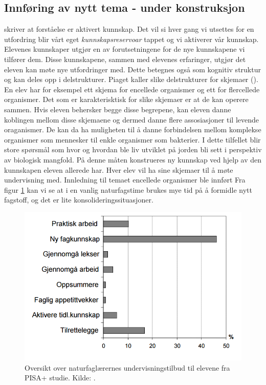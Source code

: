 \documentclass[main.tex]{subfiles}
\begin{document}
\subsection*{Innføring av nytt tema - under konstruksjon}
 skriver at forståelse er aktivert kunnskap. Det vil si hver gang vi utsettes 
for en utfordring blir vårt eget \emph{kunnskapsreservoar} tappet og vi aktiverer vår kunnskap. 
Elevenes kunnskaper utgjør en av forutsetningene for de nye kunnskapene vi tilfører dem. Disse 
kunnskapene, sammen med elevenes erfaringer, utgjør det eleven kan møte nye utfordringer med. Dette 
betegnes også som kognitiv struktur og kan deles opp i delstrukturer. Piaget 
kaller slike delstrukturer for skjemaer (). En elev har for eksempel ett skjema 
for encellede organismer og ett for flercellede organismer. Det som er karakterisktisk for slike 
skjemaer er at de kan operere sammen. Hvis eleven behersker begge disse begrepene, kan eleven danne 
koblingen mellom disse skjemaene og dermed danne flere assosiasjoner til levende oraganismer. 
De kan da ha muligheten til å danne forbindelsen mellom komplekse organismer som mennesker til enkle 
organismer som bakterier. I dette tilfellet blir store spørsmål som hvor og hvordan ble liv utviklet 
på jorden bli sett i perspektiv av biologisk mangfold. På denne måten konstrueres ny kunnskap ved hjelp 
av den kunnskapen eleven allerede har.
\newline
\newline
Hver elev vil ha sine skjemaer til å møte undervisning med. Innledning til temaet encellede organismer ble innført
\newline
\newline
Fra figur \ref{fig:odeg10} kan vi se at i en vanlig naturfagstime brukes mye tid på å formidle 
nytt fagstoff, og det er lite konsolideringssituasjoner. 


\begin{figure}[h!]
\includegraphics[scale = 0.6]{../figures/undervisnings_aktivitet.png}
\caption{Oversikt over naturfaglærernes undervisningstilbud til elevene fra PISA+ studie. Kilde: 
\protect{}.}
\label{fig:odeg10}
\end{figure}
\end{document}
